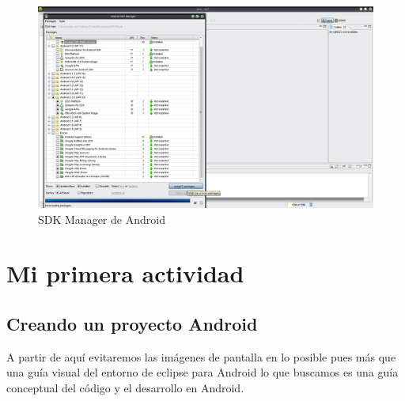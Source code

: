 \documentclass[11pt]{book}
\begin{document}
\begin{enumerate}[1.]
\begin{figure}[H]
  \centering
    \includegraphics[width=1.0\textwidth]{tutorial_9}
  \caption{SDK Manager de Android}
  \label{fig:tutorial_9}
\end{figure}
\end{enumerate}

\newpage
\chapter{Mi primera actividad}              
\newpage
\section{Creando un proyecto Android}
A partir de aquí evitaremos las imágenes de pantalla en lo posible pues más que una guía visual del entorno de eclipse para Android lo que buscamos es una guía conceptual del código y el desarrollo en Android.
\end{document}
